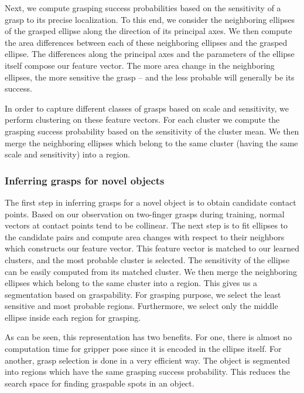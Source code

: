 \documentclass[a4paper,11pt,pdf]{pacmanreport}
\begin{document}
Next, we compute grasping success probabilities based on the
sensitivity of a grasp to its precise localization. To this end, we
consider the neighboring ellipses of the grasped ellipse along the
direction of its principal axes. We then compute the area differences
between each of these neighboring ellipses and the grasped
ellipse. The differences along the principal axes and the parameters
of the ellipse itself compose our feature vector. The more area change
in the neighboring ellipses, the more sensitive the grasp -- and the
less probable will generally be its success.

In order to capture different classes of grasps based on scale and
sensitivity, we perform clustering on these feature vectors. For each
cluster we compute the grasping success probability based on the
sensitivity of the cluster mean. We then merge the neighboring
ellipses which belong to the same cluster (having the same scale and
sensitivity) into a region.

\subsubsection{Inferring grasps for novel objects}
 
The first step in inferring grasps for a novel object is to obtain
candidate contact points. Based on our observation on two-finger
grasps during training, normal vectors at contact points tend to be
collinear. The next step is to fit ellipses to the candidate pairs and
compute area changes with respect to their neighbors which constructs
our feature vector. This feature vector is matched to our learned
clusters, and the most probable cluster is selected. The sensitivity
of the ellipse can be easily computed from its matched cluster. We
then merge the neighboring ellipses which belong to the same cluster
into a region. This gives us a segmentation based on graspability.
For grasping purpose, we select the least sensitive and most probable
regions. Furthermore, we select only the middle ellipse inside each
region for grasping.

As can be seen, this representation has two benefits. For one, there
is almost no computation time for gripper pose since it is encoded in
the ellipse itself. For another, grasp selection is done in a very
efficient way. The object is segmented into regions which have the
same grasping success probability. This reduces the search space for
finding graspable spots in an object.

\end{document}
